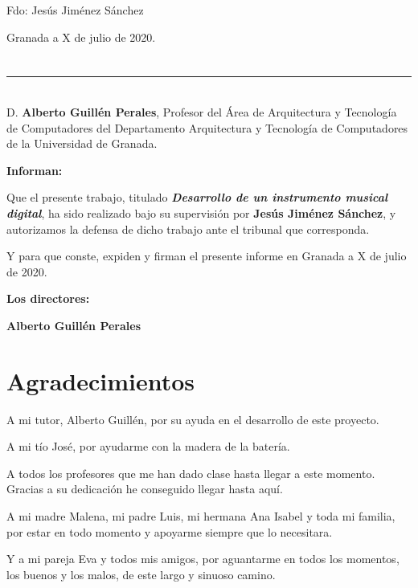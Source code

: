 \vspace{6cm}

\noindent Fdo: Jesús Jiménez Sánchez

\vspace{2cm}

\begin{flushright}
    Granada a X de julio de 2020.
\end{flushright}

\chapter*{}   %
\thispagestyle{empty}

\noindent\rule[-1ex]{\textwidth}{2pt}\\[4.5ex]

D. \textbf{Alberto Guillén Perales}, Profesor del Área de Arquitectura y Tecnología de Computadores del Departamento
Arquitectura y Tecnología de Computadores de la Universidad de Granada.

\vspace{0.5cm}

\textbf{Informan:}

\vspace{0.5cm}

Que el presente trabajo, titulado \textit{\textbf{Desarrollo de un instrumento musical digital}}, ha sido realizado bajo
su supervisión por \textbf{Jesús Jiménez Sánchez}, y autorizamos la defensa de dicho trabajo ante el tribunal que
corresponda.

\vspace{0.5cm}

Y para que conste, expiden y firman el presente informe en Granada a X de julio de 2020.

\vspace{1cm}

\textbf{Los directores:}

\vspace{5cm}

\noindent \textbf{Alberto Guillén Perales}

\chapter*{Agradecimientos}
\thispagestyle{empty}

    \vspace{1cm}

A mi tutor, Alberto Guillén, por su ayuda en el desarrollo de este proyecto.

A mi tío José, por ayudarme con la madera de la batería.

A todos los profesores que me han dado clase hasta llegar a este momento. Gracias a su dedicación he conseguido llegar
hasta aquí.

A mi madre Malena, mi padre Luis, mi hermana Ana Isabel y toda mi familia, por estar en todo momento y apoyarme siempre
que lo necesitara.

Y a mi pareja Eva y todos mis amigos, por aguantarme en todos los momentos, los buenos y los malos, de este largo y
sinuoso camino.
